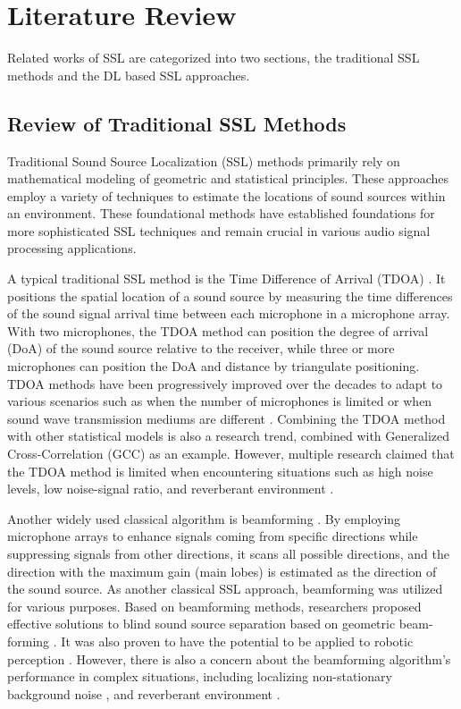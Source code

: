 \chapter*{Literature Review}

Related works of SSL are categorized into two sections, the traditional SSL methods and the DL based SSL approaches.

\section*{Review of Traditional SSL Methods}

Traditional Sound Source Localization (SSL) methods primarily rely on mathematical modeling of geometric and statistical principles. These approaches employ a variety of techniques to estimate the locations of sound sources within an environment. These foundational methods have established foundations for more sophisticated SSL techniques and remain crucial in various audio signal processing applications.

A typical traditional SSL method is the Time Difference of Arrival (TDOA) \cite{knapp_generalized_1976}. It positions the spatial location of a sound source by measuring the time differences of the sound signal arrival time between each microphone in a microphone array. With two microphones, the TDOA method can position the degree of arrival (DoA) of the sound source relative to the receiver, while three or more microphones can position the DoA and distance by triangulate positioning. TDOA methods have been progressively improved over the decades to adapt to various scenarios such as when the number of microphones is limited \cite{liu_arbitrary_2019} or when sound wave transmission mediums are different \cite{carevic_detection_2007}. Combining the TDOA method with other statistical models is also a research trend, combined with Generalized Cross-Correlation (GCC) \cite{chung_sound_2022} as an example. However, multiple research claimed that the TDOA method is limited when encountering situations such as high noise levels, low noise-signal ratio, and reverberant environment \cite{tachioka_method_2017} \cite{hao_network_2020}.

Another widely used classical algorithm is beamforming \cite{van_veen_beamforming_1988}. By employing microphone arrays to enhance signals coming from specific directions while suppressing signals from other directions, it scans all possible directions, and the direction with the maximum gain (main lobes) is estimated as the direction of the sound source. As another classical SSL approach, beamforming was utilized for various purposes. Based on beamforming methods, researchers proposed effective solutions to blind sound source separation based on geometric beam-forming \cite{parra_geometric_2002}. It was also proven to have the potential to be applied to robotic perception \cite{valin_localization_2004}. However, there is also a concern about the beamforming algorithm's performance in complex situations, including localizing non-stationary background noise \cite{comminiello_beamforming_2013}, and reverberant environment \cite{noh_dereverberation_2020}.


